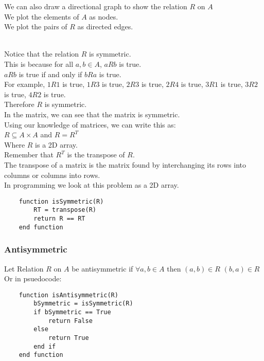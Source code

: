 We can also draw a directional graph to show the relation $R$ on $A$ \\
We plot the elements of $A$ as nodes. \\
We plot the pairs of $R$ as directed edges. \\
 \\

Notice that the relation $R$ is symmetric. \\
This is because for all $a,b \in A$, $aRb$ is true. \\
$aRb$ is true if and only if $bRa$ is true. \\
For example, $1R1$ is true, $1R3$ is true, $2R3$ is true, $2R4$ is true, $3R1$ is true, $3R2$ is true, $4R2$ is true. \\
Therefore $R$ is symmetric. \\
In the matrix, we can see that the matrix is symmetric. \\

Using our knowledge of matrices, we can write this as: \\
$R \subseteq A \times A$ and $R = R^T$ \\
Where $R$ is a 2D array. \\

Remember that $R^T$ is the transpose of $R$. \\
The transpose of a matrix is the matrix found by interchanging its rows into columns or columns into rows.\\
In programming we look at this problem as a 2D array. \\

\begin{lstlisting}
    function isSymmetric(R)
        RT = transpose(R)
        return R == RT
    end function
\end{lstlisting}

\subsubsection{Antisymmetric}
Let Relation $R$ on $A$ be antisymmetric if $\forall a,b \in A$ then $(a,b) \in R$  $(b,a) \in R$ \\
Or in psuedocode: \\
\begin{lstlisting}
    function isAntisymmetric(R)
        bSymmetric = isSymmetric(R)
        if bSymmetric == True
            return False
        else
            return True
        end if
    end function
\end{lstlisting}

